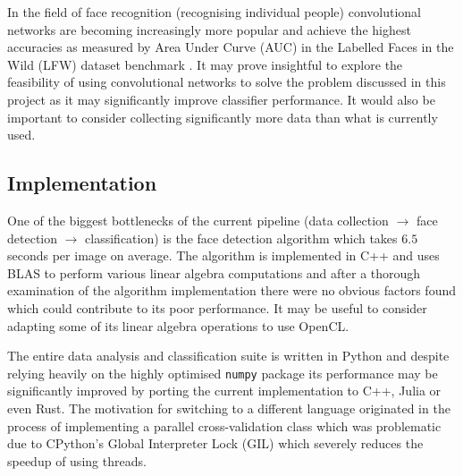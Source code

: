 In the field of face recognition (recognising individual people) convolutional
networks are becoming increasingly more popular and achieve the highest
accuracies as measured by Area Under Curve (AUC) in the Labelled Faces in the
Wild (LFW) dataset benchmark \citep{LFWTechUpdate}. It may prove insightful to
explore the feasibility of using convolutional networks to solve the problem
discussed in this project as it may significantly improve classifier
performance. It would also be important to consider collecting significantly
more data than what is currently used.

\subsection{Implementation}
One of the biggest bottlenecks of the current pipeline (data collection
$\rightarrow$ face detection $\rightarrow$ classification) is the face detection
algorithm which takes $6.5$ seconds per image on average. The algorithm is
implemented in C++ and uses BLAS to perform various linear algebra computations
and after a thorough examination of the algorithm implementation there were no
obvious factors found which could contribute to its poor performance. It may be
useful to consider adapting some of its linear algebra operations to use
OpenCL.

The entire data analysis and classification suite is written in Python and
despite relying heavily on the highly optimised \texttt{numpy} package its
performance may be significantly improved by porting the current implementation
to C++, Julia or even Rust. The motivation for switching to a different
language originated in the process of implementing a parallel cross-validation
class which was problematic due to CPython's Global Interpreter Lock (GIL)
which severely reduces the speedup of using threads. 


